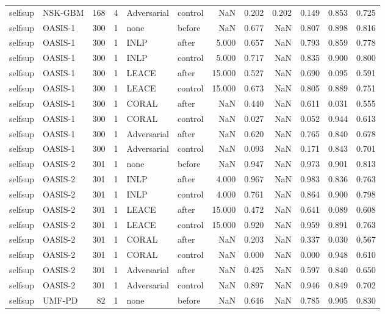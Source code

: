 \begin{tabular}{llrrllrrrrrr}
selfsup & NSK-GBM & 168 & 4 & Adversarial & control & NaN & 0.202 & 0.202 & 0.149 & 0.853 & 0.725 \\
selfsup & OASIS-1 & 300 & 1 & none & before & NaN & 0.677 & NaN & 0.807 & 0.898 & 0.816 \\
selfsup & OASIS-1 & 300 & 1 & INLP & after & 5.000 & 0.657 & NaN & 0.793 & 0.859 & 0.778 \\
selfsup & OASIS-1 & 300 & 1 & INLP & control & 5.000 & 0.717 & NaN & 0.835 & 0.900 & 0.800 \\
selfsup & OASIS-1 & 300 & 1 & LEACE & after & 15.000 & 0.527 & NaN & 0.690 & 0.095 & 0.591 \\
selfsup & OASIS-1 & 300 & 1 & LEACE & control & 15.000 & 0.673 & NaN & 0.805 & 0.889 & 0.751 \\
selfsup & OASIS-1 & 300 & 1 & CORAL & after & NaN & 0.440 & NaN & 0.611 & 0.031 & 0.555 \\
selfsup & OASIS-1 & 300 & 1 & CORAL & control & NaN & 0.027 & NaN & 0.052 & 0.944 & 0.613 \\
selfsup & OASIS-1 & 300 & 1 & Adversarial & after & NaN & 0.620 & NaN & 0.765 & 0.840 & 0.678 \\
selfsup & OASIS-1 & 300 & 1 & Adversarial & control & NaN & 0.093 & NaN & 0.171 & 0.843 & 0.701 \\
selfsup & OASIS-2 & 301 & 1 & none & before & NaN & 0.947 & NaN & 0.973 & 0.901 & 0.813 \\
selfsup & OASIS-2 & 301 & 1 & INLP & after & 4.000 & 0.967 & NaN & 0.983 & 0.836 & 0.763 \\
selfsup & OASIS-2 & 301 & 1 & INLP & control & 4.000 & 0.761 & NaN & 0.864 & 0.900 & 0.798 \\
selfsup & OASIS-2 & 301 & 1 & LEACE & after & 15.000 & 0.472 & NaN & 0.641 & 0.089 & 0.608 \\
selfsup & OASIS-2 & 301 & 1 & LEACE & control & 15.000 & 0.920 & NaN & 0.959 & 0.891 & 0.763 \\
selfsup & OASIS-2 & 301 & 1 & CORAL & after & NaN & 0.203 & NaN & 0.337 & 0.030 & 0.567 \\
selfsup & OASIS-2 & 301 & 1 & CORAL & control & NaN & 0.000 & NaN & 0.000 & 0.948 & 0.610 \\
selfsup & OASIS-2 & 301 & 1 & Adversarial & after & NaN & 0.425 & NaN & 0.597 & 0.840 & 0.650 \\
selfsup & OASIS-2 & 301 & 1 & Adversarial & control & NaN & 0.897 & NaN & 0.946 & 0.849 & 0.702 \\
selfsup & UMF-PD & 82 & 1 & none & before & NaN & 0.646 & NaN & 0.785 & 0.905 & 0.830 \\

\end{tabular}
